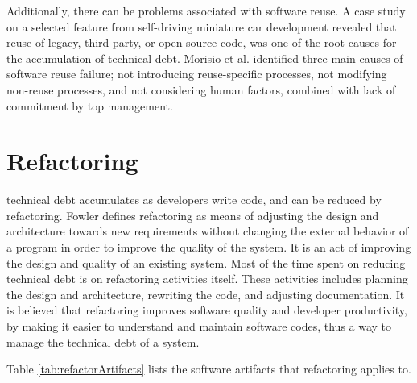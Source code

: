 Additionally, there can be problems associated with software reuse. A case study on a selected feature from self-driving miniature car development revealed that reuse of legacy, third party, or open source code, was one of the root causes for the accumulation of technical debt\cite{6974884}. Morisio et al.\cite{995420} identified three main causes of software reuse failure; not introducing reuse-specific processes, not modifying non-reuse processes, and not considering human factors, combined with lack of commitment by top management.



\section{Refactoring}
\label{sec:2-Refactoring}
technical debt accumulates as developers write code\cite{Zazworka:2011:PDD:1985362.1985372}, and can be reduced by refactoring. Fowler defines refactoring as means of adjusting the design and architecture towards new requirements without changing the external behavior of a program in order to improve the quality of the system\cite{1999:RID:311424}. It is an act of improving the design and quality of an existing system\cite{Vliet:2008:SEP:1481475}. Most of the time spent on reducing technical debt is on refactoring activities itself. These activities includes planning the design and architecture, rewriting the code, and adjusting documentation\cite{Pressman:2009:SEP:1593949}. It is believed that refactoring improves software quality and developer productivity, by making it easier to understand and maintain software codes\cite{Kim:2012:FSR:2393596.2393655}, thus a way to manage the technical debt of a system. 

Table \ref{tab:refactorArtifacts} lists the software artifacts that refactoring applies to\cite{1265817}.

